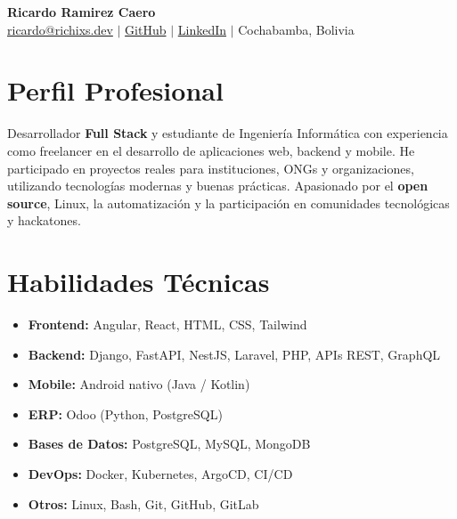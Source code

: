 \documentclass[11pt,a4paper]{article}
\begin{document}
	
	\begin{center}
		{\Huge \textbf{Ricardo Ramirez Caero}}\\
		\vspace{2mm}
		\href{mailto:ricardo@richixs.dev}{ricardo@richixs.dev} $\mid$
		\href{https://github.com/Richixs}{GitHub} $\mid$
		\href{https://linkedin.com/in/richixs}{LinkedIn} $\mid$
		Cochabamba, Bolivia
	\end{center}
	
	\section*{Perfil Profesional}
	Desarrollador \textbf{Full Stack} y estudiante de Ingeniería Informática con experiencia como freelancer en el desarrollo de aplicaciones web, backend y mobile. He participado en proyectos reales para instituciones, ONGs y organizaciones, utilizando tecnologías modernas y buenas prácticas. Apasionado por el \textbf{open source}, Linux, la automatización y la participación en comunidades tecnológicas y hackatones.
	
	\section*{Habilidades Técnicas}
	\begin{itemize}[leftmargin=*]
		\item \textbf{Frontend:} Angular, React, HTML, CSS, Tailwind
		\item \textbf{Backend:} Django, FastAPI, NestJS, Laravel, PHP, APIs REST, GraphQL
		\item \textbf{Mobile:} Android nativo (Java / Kotlin)
		\item \textbf{ERP:} Odoo (Python, PostgreSQL)
		\item \textbf{Bases de Datos:} PostgreSQL, MySQL, MongoDB
		\item \textbf{DevOps:} Docker, Kubernetes, ArgoCD, CI/CD
		\item \textbf{Otros:} Linux, Bash, Git, GitHub, GitLab
	\end{itemize}
	
\end{document}
